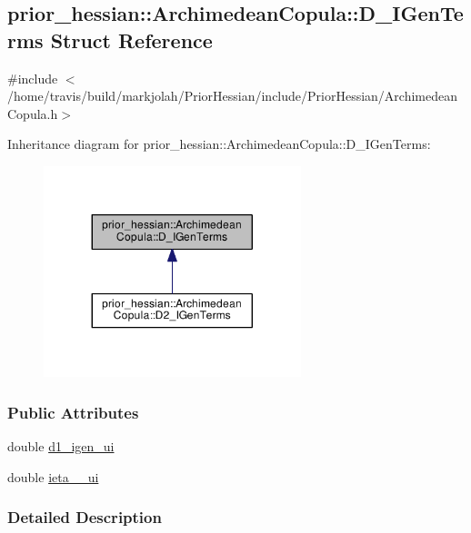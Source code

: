 \hypertarget{structprior__hessian_1_1ArchimedeanCopula_1_1D__IGenTerms}{}\subsection{prior\+\_\+hessian\+:\+:Archimedean\+Copula\+:\+:D\+\_\+\+I\+Gen\+Terms Struct Reference}
\label{structprior__hessian_1_1ArchimedeanCopula_1_1D__IGenTerms}


{\ttfamily \#include $<$/home/travis/build/markjolah/\+Prior\+Hessian/include/\+Prior\+Hessian/\+Archimedean\+Copula.\+h$>$}



Inheritance diagram for prior\+\_\+hessian\+:\+:Archimedean\+Copula\+:\+:D\+\_\+\+I\+Gen\+Terms\+:\nopagebreak
\begin{figure}[H]
\begin{center}
\leavevmode
\includegraphics[width=212pt]{structprior__hessian_1_1ArchimedeanCopula_1_1D__IGenTerms__inherit__graph}
\end{center}
\end{figure}
\subsubsection*{Public Attributes}
\begin{DoxyCompactItemize}
\item 
double \hyperlink{structprior__hessian_1_1ArchimedeanCopula_1_1D__IGenTerms_a9a54c88cceb06c4b58875d06d355201f}{d1\+\_\+igen\+\_\+ui}
\item 
double \hyperlink{structprior__hessian_1_1ArchimedeanCopula_1_1D__IGenTerms_a2ddab28b1ec16797477b79c5705d811a}{ieta\+\_\+\_\+ui}
\end{DoxyCompactItemize}


\subsubsection{Detailed Description}


